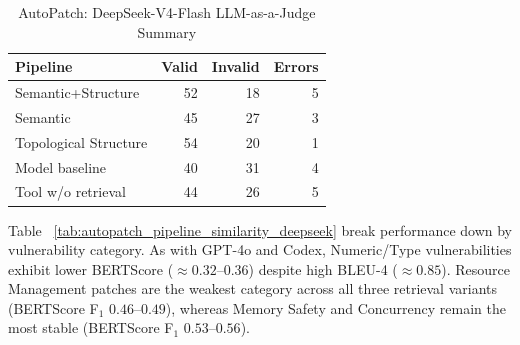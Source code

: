 \begin{table}[H]
  \centering
  \caption{DeepSeek-V4-Flash: Overall pipeline performance on the AutoPatch dataset}
  \label{tab:autopatch_overall_pipeline_performance_deepseek}
\end{table}

\begin{table}[h]
  \centering
  \small
  \caption{AutoPatch: DeepSeek-V4-Flash LLM-as-a-Judge Summary}
  \label{tab:llmjudge_autopatch_deepseek}
  \begin{tabular}{lrrr}
    \toprule
    \textbf{Pipeline}  & \textbf{Valid} & \textbf{Invalid} & \textbf{Errors} \\
    \midrule
    Semantic+Structure  & 52 & 18 & 5 \\
    Semantic  & 45 & 27 & 3 \\
    Topological Structure & 54 & 20 & 1 \\
    Model baseline & 40 & 31 & 4 \\
    Tool w/o retrieval & 44 & 26 & 5 \\
    \bottomrule
  \end{tabular}
\end{table}


Table ~\ref{tab:autopatch_pipeline_similarity_deepseek} break performance down by vulnerability category. 
As with GPT-4o and Codex, Numeric/Type vulnerabilities exhibit lower BERTScore ($\approx 0.32$--$0.36$) despite high BLEU-4 ($\approx 0.85$). Resource Management patches are the weakest category across all three retrieval variants (BERTScore F$_1$ $0.46$--$0.49$), whereas Memory Safety and Concurrency remain the most stable (BERTScore F$_1$ $0.53$--$0.56$).

